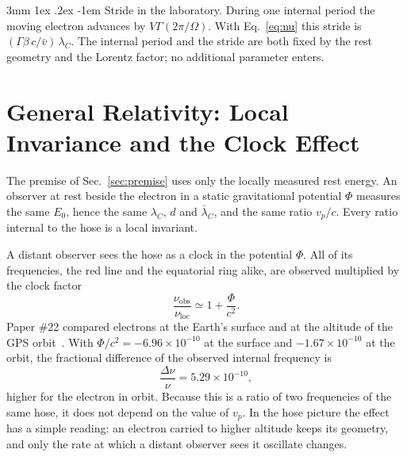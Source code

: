\documentclass[%
 reprint, amsmath,amssymb, aps, prb, ]{revtex4-2}
\makeatletter
\numberwithin{equation}{section}
\renewcommand\paragraph{%
  \@startsection{paragraph}{4}{\z@}%
    {3mm \@plus 1ex \@minus .2ex}%
    {-1em}%
    {\normalfont\normalsize\itshape}}
\newcommand{\lamC}{\lambda_C}
\newcommand{\lbar}{\bar{\lambda}_C}
\makeatother
\begin{document}
\paragraph{Stride in the laboratory.} During one internal period the moving electron advances by $V\Gamma(2\pi/\Omega)$. With Eq.~\eqref{eq:nu} this stride is $(\Gamma\beta\,c/\bar v)\,\lamC$. The internal period and the stride are both fixed by the rest geometry and the Lorentz factor; no additional parameter enters.

\section{General Relativity: Local Invariance and the Clock Effect}
\label{sec:gr}

The premise of Sec.~\ref{sec:premise} uses only the locally measured rest energy. An observer at rest beside the electron in a static gravitational potential $\Phi$ measures the same $E_0$, hence the same $\lamC$, $d$ and $\lbar$, and the same ratio $v_p/c$. Every ratio internal to the hose is a local invariant.

A distant observer sees the hose as a clock in the potential $\Phi$. All of its frequencies, the red line and the equatorial ring alike, are observed multiplied by the clock factor~\cite{PoundRebka1960}
\begin{equation}
\frac{\nu_{\text{obs}}}{\nu_{\text{loc}}} \simeq 1 + \frac{\Phi}{c^2} .
\label{eq:redshift}
\end{equation}
Paper \#22 compared electrons at the Earth's surface and at the altitude of the GPS orbit~\cite{H22}. With $\Phi/c^2 = -6.96\times10^{-10}$ at the surface and $-1.67\times10^{-10}$ at the orbit, the fractional difference of the observed internal frequency is
\begin{equation}
\frac{\Delta\nu}{\nu} = 5.29\times10^{-10},
\label{eq:dnu}
\end{equation}
higher for the electron in orbit. Because this is a ratio of two frequencies of the same hose, it does not depend on the value of $v_p$. In the hose picture the effect has a simple reading: an electron carried to higher altitude keeps its geometry, and only the rate at which a distant observer sees it oscillate changes.

\end{document}
